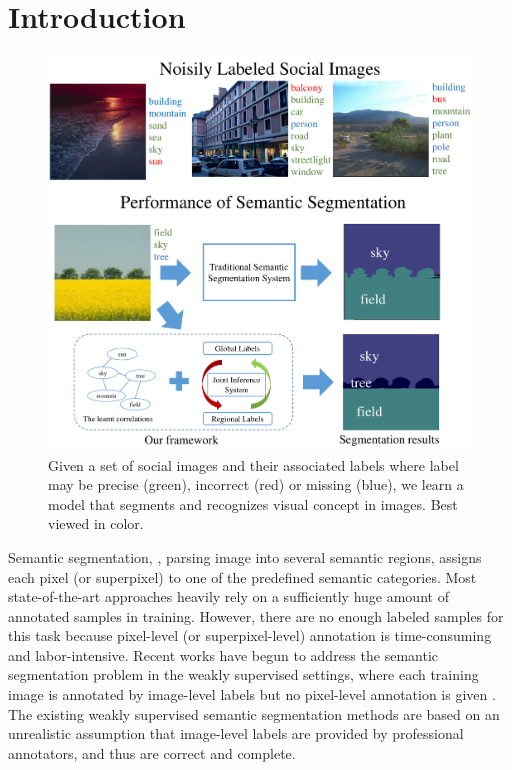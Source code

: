 \section{Introduction}

\begin{figure}[t]
\begin{center}
    \includegraphics[width=1\linewidth]{fig_noisyparsing.pdf}
\end{center}
    \caption{Given a set of social images and their associated labels where label may be precise (green), incorrect (red) or missing (blue), we learn a model that segments and recognizes visual concept in images. Best viewed in color.}
\label{fig:noisyparsing}
\vspace{-3mm}
\end{figure}

Semantic segmentation, \ie, parsing image into several semantic regions, assigns each pixel (or superpixel) to one of the predefined semantic categories.
Most state-of-the-art approaches heavily rely on a sufficiently huge amount of annotated samples in training.
However, there are no enough labeled samples for this task because pixel-level (or superpixel-level) annotation is time-consuming and labor-intensive. 
Recent works have begun to address the semantic segmentation problem in the weakly supervised settings, where each training image is annotated by image-level labels but no pixel-level annotation is given \cite{verbeek2007region,vezhnevets2010towards,vezhnevets2011weakly,vezhnevets2012weakly,xu2014tell,zhang2013sparse,zhang2013probabilistic}. 
The existing weakly supervised semantic segmentation methods are based on an unrealistic assumption that image-level labels are provided by professional annotators, and thus are correct and complete.



